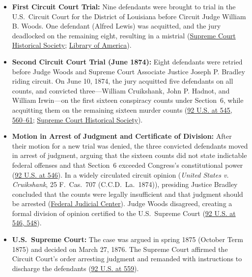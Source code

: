 \documentclass[12pt]{article}
\begin{document}
\begin{itemize}
    \item \textbf{First Circuit Court Trial:} Nine defendants were brought to trial in the U.S.~Circuit Court for the District of Louisiana before Circuit Judge William B. Woods. One defendant (Alfred Lewis) was acquitted, and the jury deadlocked on the remaining eight, resulting in a mistrial (\href{https://civics.supremecourthistory.org/article/united-states-v-cruikshank/}{Supreme Court Historical Society}; \href{https://storyoftheweek.loa.org/2023/04/the-colfax-massacre-trial.html}{Library of America}).
    \item \textbf{Second Circuit Court Trial (June 1874):} Eight defendants were retried before Judge Woods and Supreme Court Associate Justice Joseph P. Bradley riding circuit. On June 10, 1874, the jury acquitted five defendants on all counts, and convicted three---William Cruikshank, John P. Hadnot, and William Irwin---on the first sixteen conspiracy counts under Section~6, while acquitting them on the remaining sixteen murder counts (\href{https://supreme.justia.com/cases/federal/us/92/542/}{92 U.S. at 545, 560--61}; \href{https://civics.supremecourthistory.org/article/united-states-v-cruikshank/}{Supreme Court Historical Society}).
    \item \textbf{Motion in Arrest of Judgment and Certificate of Division:} After their motion for a new trial was denied, the three convicted defendants moved in arrest of judgment, arguing that the sixteen counts did not state indictable federal offenses and that Section~6 exceeded Congress's constitutional power (\href{https://supreme.justia.com/cases/federal/us/92/542/}{92 U.S. at 546}). In a widely circulated circuit opinion (\textit{United States v. Cruikshank}, 25 F.~Cas.~707 (C.C.D.~La.~1874)), presiding Justice Bradley concluded that the counts were legally insufficient and that judgment should be arrested (\href{https://www.fjc.gov/history/exhibits/circuit-court-opinions/United-States-v-Cruikshank}{Federal Judicial Center}). Judge Woods disagreed, creating a formal division of opinion certified to the U.S.~Supreme Court (\href{https://supreme.justia.com/cases/federal/us/92/542/}{92 U.S. at 546, 548}).
    \item \textbf{U.S.~Supreme Court:} The case was argued in spring 1875 (October Term 1875) and decided on March 27, 1876. The Supreme Court affirmed the Circuit Court's order arresting judgment and remanded with instructions to discharge the defendants (\href{https://supreme.justia.com/cases/federal/us/92/542/}{92 U.S. at 559}).
\end{itemize}
\end{document}

